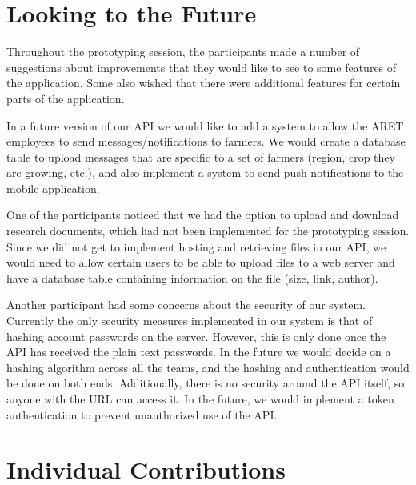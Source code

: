 \documentclass[12pt,letterpaper]{article}
\begin{document}
\clearpage
\section{Looking to the Future}
Throughout the prototyping session, the participants made a number of suggestions about improvements that they would like to see to some features of the application. Some also wished that there were additional features for certain parts of the application.\par	
In a future version of our API we would like to add a system to allow the ARET employees to send messages/notifications to farmers. We would create a database table to upload messages that are specific to a set of farmers (region, crop they are growing, etc.), and also implement a system to send push notifications to the mobile application.\par
One of the participants noticed that we had the option to upload and download research documents, which had not been implemented for the prototyping session. Since we did not get to implement hosting and retrieving files in our API, we would need to allow certain users to be able to upload files to a web server and have a database table containing information on the file (size, link, author).\par
Another participant had some concerns about the security of our system. Currently the only security measures implemented in our system is that of hashing account passwords on the server. However, this is only done once the API has received the plain text passwords. In the future we would decide on a hashing algorithm across all the teams, and the hashing and authentication would be done on both ends. Additionally, there is no security around the API itself, so anyone with the URL can access it. In the future, we would implement a token authentication to prevent unauthorized use of the API.\par

\clearpage
\section{Individual Contributions}
\end{document}
